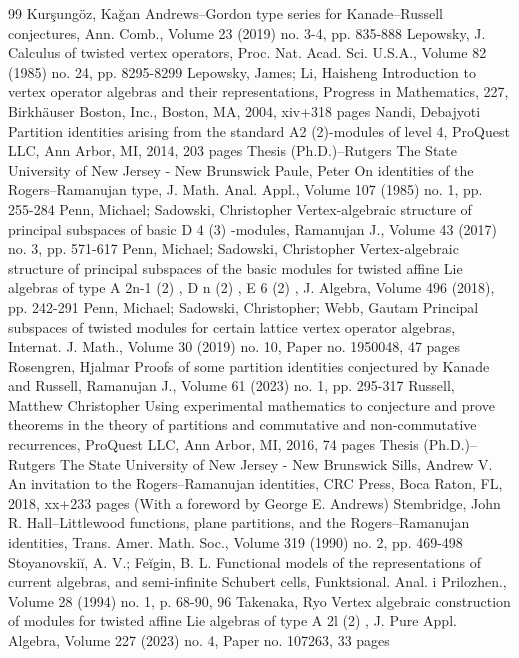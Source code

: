\documentclass[10pt]{article}
\begin{document}
\begin{thebibliography}{99}
Kurşungöz, Kağan Andrews–Gordon type series for Kanade–Russell conjectures, Ann. Comb., Volume 23 (2019) no. 3-4, pp. 835-888
Lepowsky, J. Calculus of twisted vertex operators, Proc. Nat. Acad. Sci. U.S.A., Volume 82 (1985) no. 24, pp. 8295-8299
Lepowsky, James; Li, Haisheng Introduction to vertex operator algebras and their representations, Progress in Mathematics, 227, Birkhäuser Boston, Inc., Boston, MA, 2004, xiv+318 pages
Nandi, Debajyoti Partition identities arising from the standard A2 (2)-modules of level 4, ProQuest LLC, Ann Arbor, MI, 2014, 203 pages Thesis (Ph.D.)–Rutgers The State University of New Jersey - New Brunswick
Paule, Peter On identities of the Rogers–Ramanujan type, J. Math. Anal. Appl., Volume 107 (1985) no. 1, pp. 255-284
Penn, Michael; Sadowski, Christopher Vertex-algebraic structure of principal subspaces of basic D 4 (3) -modules, Ramanujan J., Volume 43 (2017) no. 3, pp. 571-617
Penn, Michael; Sadowski, Christopher Vertex-algebraic structure of principal subspaces of the basic modules for twisted affine Lie algebras of type A 2n-1 (2) , D n (2) , E 6 (2) , J. Algebra, Volume 496 (2018), pp. 242-291
Penn, Michael; Sadowski, Christopher; Webb, Gautam Principal subspaces of twisted modules for certain lattice vertex operator algebras, Internat. J. Math., Volume 30 (2019) no. 10, Paper no. 1950048, 47 pages
Rosengren, Hjalmar Proofs of some partition identities conjectured by Kanade and Russell, Ramanujan J., Volume 61 (2023) no. 1, pp. 295-317
Russell, Matthew Christopher Using experimental mathematics to conjecture and prove theorems in the theory of partitions and commutative and non-commutative recurrences, ProQuest LLC, Ann Arbor, MI, 2016, 74 pages Thesis (Ph.D.)–Rutgers The State University of New Jersey - New Brunswick
Sills, Andrew V. An invitation to the Rogers–Ramanujan identities, CRC Press, Boca Raton, FL, 2018, xx+233 pages (With a foreword by George E. Andrews)
Stembridge, John R. Hall–Littlewood functions, plane partitions, and the Rogers–Ramanujan identities, Trans. Amer. Math. Soc., Volume 319 (1990) no. 2, pp. 469-498
Stoyanovskiĭ, A. V.; Feĭgin, B. L. Functional models of the representations of current algebras, and semi-infinite Schubert cells, Funktsional. Anal. i Prilozhen., Volume 28 (1994) no. 1, p. 68-90, 96
Takenaka, Ryo Vertex algebraic construction of modules for twisted affine Lie algebras of type A 2l (2) , J. Pure Appl. Algebra, Volume 227 (2023) no. 4, Paper no. 107263, 33 pages

\end{thebibliography}
\end{document}
